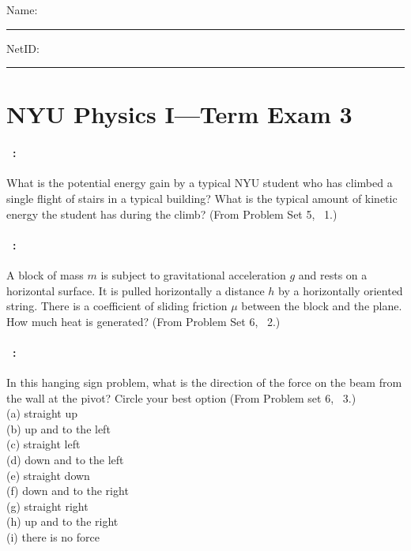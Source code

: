 \documentclass[12pt]{article} 
\begin{document}
\noindent
Name: \rule[-1ex]{0.55\textwidth}{0.1pt}
NetID: \rule[-1ex]{0.2\textwidth}{0.1pt}

\section*{NYU Physics I---Term Exam 3}

\paragraph{\problemname~\theproblem:}%
What is the potential energy gain by a typical NYU student who has
climbed a single flight of stairs in a typical building? What is the
typical amount of kinetic energy the student has during the climb?
(From Problem Set 5, \problemname~1.)

\vfill

\paragraph{\problemname~\theproblem:}%
A block of mass $m$ is subject to gravitational acceleration $g$ and
rests on a horizontal surface. It is pulled horizontally a distance
$h$ by a horizontally oriented string. There is a coefficient of
sliding friction $\mu$ between the block and the plane. How much heat
is generated?  (From Problem Set 6, \problemname~2.)

\vfill

\paragraph{\problemname~\theproblem:}%
In this hanging sign problem, what is the direction of the force on
the beam from the wall at the pivot? Circle your best option (From Problem set 6,
\problemname~3.)\\
(a) straight up\\
(b) up and to the left\\
(c) straight left\\
(d) down and to the left\\
(e) straight down\\
(f) down and to the right\\
(g) straight right\\
(h) up and to the right\\
(i) there is no force
\end{document}
